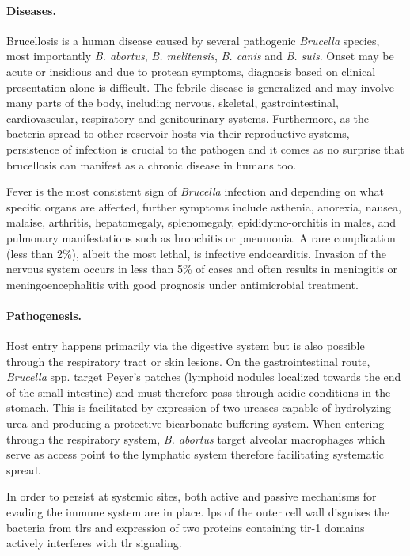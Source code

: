 \paragraph{Diseases.}
Brucellosis is a human disease caused by several pathogenic \textit{Brucella} species, most importantly \textit{B. abortus}, \textit{B. melitensis}, \textit{B. canis} and \textit{B. suis}. Onset may be acute or insidious and due to protean symptoms, diagnosis based on clinical presentation alone is difficult. The febrile disease is generalized and may involve many parts of the body, including nervous, skeletal, gastrointestinal, cardiovascular, respiratory and genitourinary systems. Furthermore, as the bacteria spread to other reservoir hosts via their reproductive systems, persistence of infection is crucial to the pathogen and it comes as no surprise that brucellosis can manifest as a chronic disease in humans too.

Fever is the most consistent sign of \textit{Brucella} infection and depending on what specific organs are affected, further symptoms include asthenia, anorexia, nausea, malaise, arthritis, hepatomegaly, splenomegaly, epididymo-orchitis in males, and pulmonary manifestations such as bronchitis or pneumonia. A rare complication (less than 2\%), albeit the most lethal, is infective endocarditis. Invasion of the nervous system occurs in less than 5\% of cases and often results in meningitis or meningoencephalitis with good prognosis under antimicrobial treatment.

\paragraph{Pathogenesis.}
Host entry happens primarily via the digestive system but is also possible through the respiratory tract or skin lesions. On the gastrointestinal route, \textit{Brucella} spp. target Peyer's patches (lymphoid nodules localized towards the end of the small intestine) and must therefore pass through acidic conditions in the stomach. This is facilitated by expression of two ureases capable of hydrolyzing urea and producing a protective bicarbonate buffering system. When entering through the respiratory system, \textit{B. abortus} target alveolar macrophages which serve as access point to the lymphatic system therefore facilitating systematic spread.


In order to persist at systemic sites, both active and passive mechanisms for evading the immune system are in place. \Gls{lps} of the outer cell wall disguises the bacteria from \glspl{tlr} and expression of two proteins containing \gls{tir-1} domains actively interferes with \gls{tlr} signaling.

